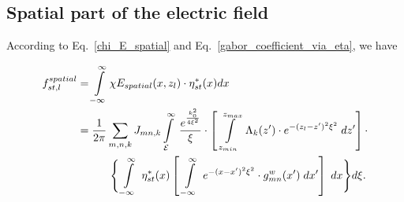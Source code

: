 \documentclass[preprint,12pt]{elsarticle}
\begin{document}
\subsection{Spatial part of the electric field}
According to Eq.~\eqref{chi_E_spatial} and Eq.~\eqref{gabor_coefficient_via_eta}, we have
\begin{small}
\begin{equation}
\begin{split}
f^{spatial}_{st,l} &= \int \limits^{\infty}_{-\infty} \chi E_{spatial}(x,z_l) \cdot \eta^*_{st}(x) dx \\
&= \frac{1}{2\pi}\sum_{m,n,k}J_{mn,k} \int \limits^{\infty}_{\mathcal{E}}  \; \frac{e^{\frac{k_0^2}{4\xi^2}}}{\xi} \cdot \left[ \; \int \limits^{z_{max}}_{z_{min}}\; \Lambda_k(z') \cdot e^{-(z_l-z')^2\xi^2 } \;  dz'\right]
\cdot \\
&\qquad  \quad 
 \Bigg{\{}  \int \limits^{\infty}_{-\infty}  \; \eta^*_{st}(x) \left[\; \int \limits^{\infty}_{-\infty} \; e^{-(x-x')^2\xi^2} \cdot {g^w_{mn}}(x') \; dx'\right] \; dx\Bigg{\}} d\xi .
\end{split}
\label{f_spatial_mnl}
\end{equation}
\end{small}
\end{document}
